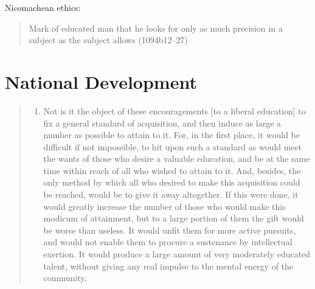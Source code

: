 Nicomachean ethics:

\begin{quote}

Mark of educated man that he looks for only as much precision in a subject as the subject allows (1094b12--27)
\end{quote}

\section{National Development}
\label{nationaldevelopment}

\begin{quote}

\begin{enumerate}
\item Not is it the object of these encouragements [to a liberal education] to fix a general standard of acquisition, and then induce as large a number as possible to attain to it. For, in the first place, it would be difficult if not impossible, to hit upon such a standard as would meet the wants of those who desire a valuable education, and be at the same time within reach of all who wished to attain to it. And, besides, the only method by which all who desired to make this acquisition could be reached, would be to give it away altogether. If this were done, it would greatly increase the number of those who would make this modicum of attainment, but to a large portion of them the gift would be worse than useless. It would unfit them for more active pursuits, and would not enable them to procure a sustenance by intellectual exertion. It would produce a large amount of very moderately educated talent, without giving any real impulse to the mental energy of the community.


\end{enumerate}
\end{quote}
